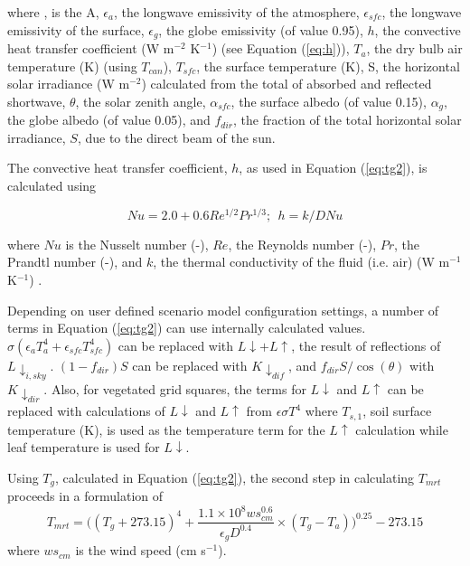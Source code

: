 \documentclass[final,3p,times,authoryear]{elsarticle}
\begin{document}
where , is the \glsdesc{A},
$\epsilon_{a}$, the longwave emissivity of the atmosphere, 
$\epsilon_{sfc}$, the longwave emissivity of the surface, 
$\epsilon_{g}$, the globe emissivity (of value 0.95), 
$h$, the convective heat transfer coefficient (W m$^{-2}$ K$^{-1}$) (see Equation (\ref{eq:h})), 
$T_{a}$, the dry bulb air temperature (K) (using $T_{can}$), 
$T_{sfc}$, the surface temperature (K), 
S, the horizontal solar irradiance (W m$^{-2}$) calculated from the total of absorbed and reflected shortwave, 
$\theta$, the solar zenith angle, 
$\alpha_{sfc}$, the surface albedo (of value 0.15),  
$\alpha_{g}$, the globe albedo (of value 0.05), and 
$f_{dir}$, the fraction of the total horizontal solar irradiance, 
$S$, due to the direct beam of the sun. 




The convective heat transfer coefficient, $h$, as used in Equation (\ref{eq:tg2}), is calculated using 

\begin{equation}\label{eq:h}
Nu = 2.0 + 0.6Re^{1/2}Pr^{1/3};  ~~h = k / D Nu
\end{equation}

where $Nu$ is the Nusselt number (-),
$Re$, the Reynolds number (-),
$Pr$, the Prandtl number (-), and 
$k$, the thermal conductivity of the fluid (i.e. air) (W m$^{-1}$K$^{-1}$) \citep{Liljegren2008}.



Depending on user defined scenario model configuration settings, a number of terms in Equation (\ref{eq:tg2}) can use internally calculated values. $\sigma (\epsilon_{a} T_{a}^{4} + \epsilon_{sfc} T_{sfc}^{4} )$ can be replaced with $L\downarrow + L\uparrow$, the result of reflections of $L \downarrow_{i,sky}$. $(1-f_{dir})S$ can be replaced with $K \downarrow_{dif}$, and $f_{dir}S/ \cos(\theta)$ with $K \downarrow_{dir}$. Also, for vegetated grid squares, the terms for $L\downarrow$ and $L\uparrow$ can be replaced with calculations of $L\downarrow$ and $L\uparrow$ from $\epsilon \sigma T^{4}$ where $T_{s,1}$, soil surface temperature (K), is used as the temperature term for the $L\uparrow$ calculation while leaf temperature is used for $L\downarrow$. 

Using $T_{g}$, calculated in Equation (\ref{eq:tg2}), the second step in calculating $T_{mrt}$ proceeds in a formulation of \cite{Kantor2011} 
\begin{equation}\label{eq:tmrtbucket}
  T_{mrt} = 
  \bigg(
   (T_{g}+273.15)^{4} + 
    \frac{1.1 \times 10^{8}  ws_{cm}^{0.6}}{\epsilon_{g}  D^{0.4}}
    \times 
     (T_{g}-T_{a})
    \bigg)^{0.25} - 273.15
\end{equation}
 where $ws_{cm}$ is the wind speed (cm s$^{-1}$).
\end{document}
